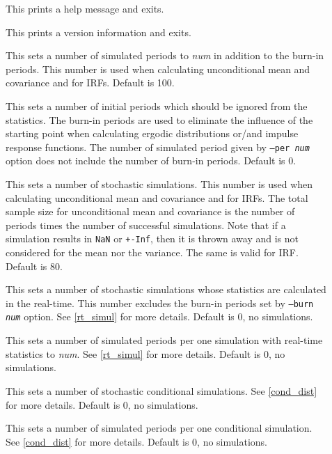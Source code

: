 \documentclass[10pt]{article}
\begin{document}
\begin{description}
\item[] This prints a help message and exits.

\item[] This prints a version information and
exits.

\item[] This sets a number of simulated
periods to {\it num} in addition to the burn-in periods. This number
is used when calculating unconditional mean and covariance and for
IRFs. Default is 100.

\item[] This sets a number of initial periods
which should be ignored from the statistics. The burn-in periods are
used to eliminate the influence of the starting point when
calculating ergodic distributions or/and impulse response
functions. The number of simulated period given by {\tt --per \it
  num} option does not include the number of burn-in
periods. Default is 0.

\item[] This sets a number of stochastic
simulations. This number is used when calculating unconditional mean
and covariance and for IRFs. The total sample size for unconditional
mean and covariance is the number of periods times the number of
successful simulations. Note that if a simulation results in {\tt NaN}
or {\tt +-Inf}, then it is thrown away and is not considered for the
mean nor the variance. The same is valid for IRF. Default is 80.

\item[] This sets a number of stochastic
simulations whose statistics are calculated in the real-time. This
number excludes the burn-in periods set by {\tt --burn \it num}
option. See \ref{rt_simul} for more details. Default is 0, no
simulations.

\item[] This sets a number of simulated
periods per one simulation with real-time statistics to {\it num}. See
\ref{rt_simul} for more details. Default is 0, no simulations.

\item[] This sets a number of stochastic
conditional simulations. See \ref{cond_dist} for more details. Default
is 0, no simulations.

\item[] This sets a number of simulated
periods per one conditional simulation. See \ref{cond_dist} for more
details. Default is 0, no simulations.


\end{description}
\end{document}
